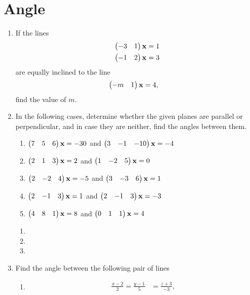 \documentclass[journal,12pt,twocolumn]{IEEEtran}
\renewcommand\thesection{\arabic{section}}
\begin{document}
\section{Angle}
\renewcommand{\theequation}{\theenumi}
\begin{enumerate}[label=\thesection.\arabic*.,ref=\thesection.\theenumi]

\item If the lines
%
%
\begin{align}
\begin{pmatrix}-3 & 1\end{pmatrix}\mathbf{x} &= 1
\\
\begin{pmatrix}-1 & 2\end{pmatrix}\mathbf{x} &= 3
\end{align}
%
are equally inclined to the line
%
\begin{align}
\begin{pmatrix}-m & 1\end{pmatrix}\mathbf{x} &= 4,
\end{align}
%
find the value of $m$.
%
\item In the following cases, determine whether the given planes are parallel or perpendicular, and in case they are neither, find the angles between them.
\begin{enumerate}
\item 
$
\begin{pmatrix}7 & 5 & 6\end{pmatrix}\mathbf{x}=-30
$
 and 
$
\begin{pmatrix}3 & -1 & -10\end{pmatrix}\mathbf{x}=-4
$
%
\item 
$
\begin{pmatrix}2 & 1 & 3\end{pmatrix}\mathbf{x}=2
$
 and 
$
\begin{pmatrix}1 & -2 & 5\end{pmatrix}\mathbf{x}=0
$
%
\item 
$
\begin{pmatrix}2 & -2 & 4\end{pmatrix}\mathbf{x}=-5
$
 and 
$
\begin{pmatrix}3 & -3 & 6\end{pmatrix}\mathbf{x}=1
$
\item 
$
\begin{pmatrix}2 & -1 & 3\end{pmatrix}\mathbf{x}=1
$
 and 
$
\begin{pmatrix}2 & -1 & 3\end{pmatrix}\mathbf{x}=-3
$
\item 
$
\begin{pmatrix}4 & 8 & 1\end{pmatrix}\mathbf{x}=8
$
 and 
$
\begin{pmatrix}0 & 1 & 1\end{pmatrix}\mathbf{x}=4
$
\end{enumerate}
\solution
\begin{enumerate}
    \item 
    \item 
    \item 
\end{enumerate}
\item Find the angle between the following pair of lines
\begin{enumerate}
\item 
\begin{align}
\frac{x-2}{2} = \frac{y-1}{5} &= \frac{z+3}{-3}, 
\\

\end{align}
\end{enumerate}
\end{enumerate}
\end{document}
